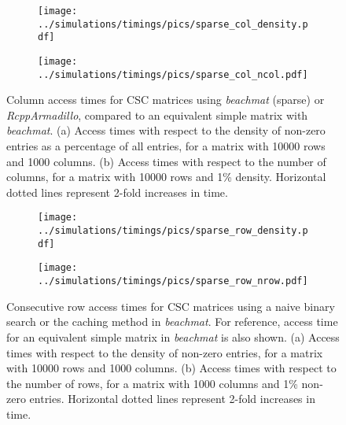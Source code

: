 \documentclass{article}
\newcommand{\beachmat}{\textit{beachmat}}
\begin{document}
\begin{figure}[bt]
    \centering
    \begin{subfigure}[b]{0.49\textwidth}
        \texttt{[image: ../simulations/timings/pics/sparse\_col\_density.pdf]}
        \caption{}
    \end{subfigure}
    \begin{subfigure}[b]{0.49\textwidth}
        \texttt{[image: ../simulations/timings/pics/sparse\_col\_ncol.pdf]}
        \caption{}
    \end{subfigure}
    \caption{Column access times for CSC matrices using \beachmat{} (sparse) or \textit{RcppArmadillo}, compared to an equivalent simple matrix with \beachmat{}.
        (a) Access times with respect to the density of non-zero entries as a percentage of all entries, for a matrix with 10000 rows and 1000 columns.
        (b) Access times with respect to the number of columns, for a matrix with 10000 rows and 1\% density.
        Horizontal dotted lines represent 2-fold increases in time.
    }
    \label{fig:sparsecol}
\end{figure}

\begin{figure}[btp]
    \begin{subfigure}[b]{0.49\textwidth}
        \texttt{[image: ../simulations/timings/pics/sparse\_row\_density.pdf]}
        \caption{}
    \end{subfigure}
    \begin{subfigure}[b]{0.49\textwidth}
        \texttt{[image: ../simulations/timings/pics/sparse\_row\_nrow.pdf]}
        \caption{}
    \end{subfigure}
    \caption{Consecutive row access times for CSC matrices using a naive binary search or the caching method in \beachmat{}.
        For reference, access time for an equivalent simple matrix in \beachmat{} is also shown.
        (a) Access times with respect to the density of non-zero entries, for a matrix with 10000 rows and 1000 columns.
        (b) Access times with respect to the number of rows, for a matrix with 1000 columns and 1\% non-zero entries.
        Horizontal dotted lines represent 2-fold increases in time.
    }
    \label{fig:sparserow}
\end{figure}
\end{document}
